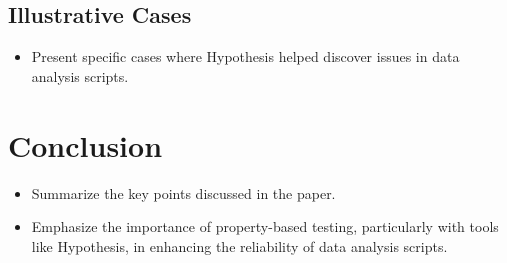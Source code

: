 \documentclass[runningheads]{llncs}
\begin{document}
\subsection{Illustrative Cases}
\begin{itemize}
  \item Present specific cases where Hypothesis helped discover issues in data analysis scripts.
\end{itemize}

\section{Conclusion}
\begin{itemize}
  \item Summarize the key points discussed in the paper.
  \item Emphasize the importance of property-based testing, particularly with tools like Hypothesis, in enhancing the reliability of data analysis scripts.
\end{itemize}
%
%
%


\end{document}
